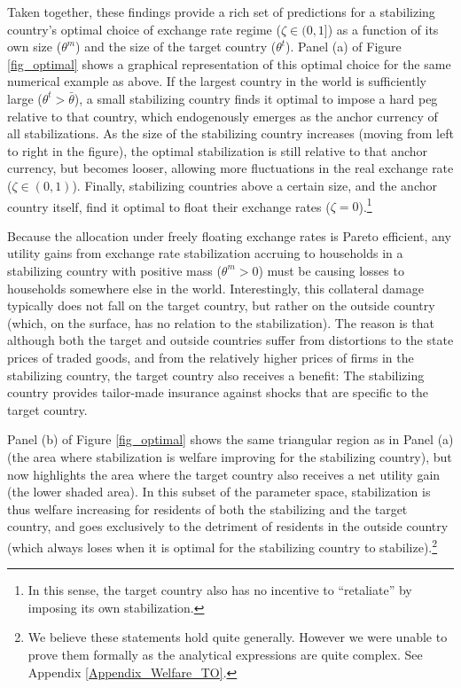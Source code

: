 \documentclass[12pt,letter]{article}
\theoremstyle{break} \theorembodyfont{\normalfont\itshape}
\theoremstyle{break}
\theoremstyle{break} \theorembodyfont{\normalfont\itshape}
\theoremstyle{break} \theorembodyfont{\normalfont\itshape}
\begin{document}
Taken together, these findings provide a rich set of predictions for a
stabilizing country's optimal choice of exchange rate regime
(\(\zeta \in(0,1] \)) as a function of its own size (\(\theta^m\)) and
the size of the target country (\(\theta^t\)). Panel (a) of Figure
\ref{fig_optimal} shows a graphical representation of this optimal
choice for the same numerical example as above. If the largest country
in the world is sufficiently large ($\theta^t>\bar{\theta}$), a small
stabilizing country finds it optimal to impose a hard peg relative to
that country, which endogenously emerges as the anchor currency of all
stabilizations. As the size of the stabilizing country increases
(moving from left to right in the figure), the optimal stabilization
is still relative to that anchor currency, but becomes looser,
allowing more fluctuations in the real exchange rate
(\(\zeta \in(0,1) \)). Finally, stabilizing countries above a certain
size, and the anchor country itself, find it optimal to float their
exchange rates (\(\zeta=0\)).\footnote{In this sense, the target
  country also has no incentive to ``retaliate'' by imposing its own
  stabilization.}




Because the allocation under freely floating exchange rates is Pareto
efficient, any utility gains from exchange rate stabilization accruing
to households in a stabilizing country with positive mass
(\(\theta^m>0\)) must be causing losses to households somewhere else
in the world. Interestingly, this collateral damage typically does not
fall on the target country, but rather on the outside country (which,
on the surface, has no relation to the stabilization). The reason is
that although both the target and outside countries suffer from
distortions to the state prices of traded goods, and from the
relatively higher prices of firms in the stabilizing country, the
target country also receives a benefit: The stabilizing country
provides tailor-made insurance against shocks that are specific to the
target country.

Panel (b) of Figure \ref{fig_optimal} shows the same triangular region
as in Panel (a) (the area where stabilization is welfare improving for
the stabilizing country), but now highlights the area where the target
country also receives a net utility gain (the lower shaded area). In
this subset of the parameter space, stabilization is thus welfare
increasing for residents of both the stabilizing and the target
country, and goes exclusively to the detriment of residents in the
outside country (which always loses when it is optimal for the
stabilizing country to stabilize).\footnote{We believe these
  statements hold quite generally. However we were unable to prove
  them formally as the analytical expressions are quite complex. See
  Appendix \ref{Appendix_Welfare_TO}.}
\end{document}
